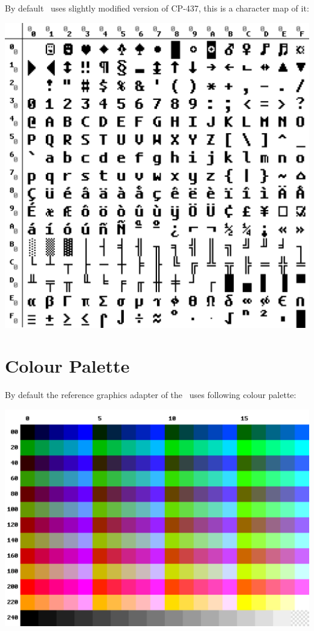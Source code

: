 By default \thismachine\ uses slightly modified version of CP-437, this is a character map of it:

{\centering
\includegraphics[width=\linewidth]{tsvmcp.png}
\label{fig:codepage}
}
\newpage

\section{Colour Palette}
\label{colourpalette}

By default the reference graphics adapter of the \thismachine\ uses following colour palette:

{\centering
\includegraphics[width=\linewidth]{tsvmpal.png}
\label{fig:codepage}
}

